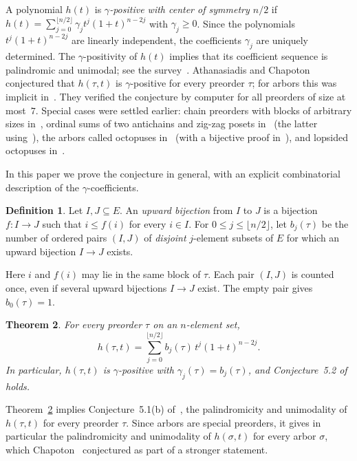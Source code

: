 \documentclass[11pt]{amsart}
\newtheorem{theorem}{Theorem}[section]
\theoremstyle{definition}
\newtheorem{definition}[theorem]{Definition}
\theoremstyle{remark}
\numberwithin{equation}{section}
\begin{document}
A polynomial $h(t)$ is \emph{$\gamma$-positive with center of symmetry $n/2$} if $h(t)=\sum_{j=0}^{\lfloor n/2\rfloor}\gamma_j t^j(1+t)^{n-2j}$ with $\gamma_j\ge 0$. Since the polynomials $t^j(1+t)^{n-2j}$ are linearly independent, the coefficients $\gamma_j$ are uniquely determined. The $\gamma$-positivity of $h(t)$ implies that its coefficient sequence is palindromic and unimodal; see the survey~\cite{Ath18}. Athanasiadis and Chapoton~\cite[Conjecture~5.2]{AC} conjectured that $h(\tau,t)$ is $\gamma$-positive for every preorder $\tau$; for arbors this was implicit in~\cite{Cha}. They verified the conjecture by computer for all preorders of size at most~$7$. Special cases were settled earlier: chain preorders with blocks of arbitrary sizes in~\cite{Ath25}, ordinal sums of two antichains and zig-zag posets in~\cite[Section~9]{AC} (the latter using~\cite{WZC}), the arbors called octopuses in~\cite{AXY} (with a bijective proof in~\cite{Men}), and lopsided octopuses in~\cite{Men}.

In this paper we prove the conjecture in general, with an explicit combinatorial description of the $\gamma$-coefficients.

\begin{definition}\label{def:upward}
Let $I,J\subseteq E$. An \emph{upward bijection} from $I$ to $J$ is a bijection $f\colon I\to J$ such that $i\le f(i)$ for every $i\in I$. For $0\le j\le \lfloor n/2\rfloor$, let $b_j(\tau)$ be the number of ordered pairs $(I,J)$ of \emph{disjoint} $j$-element subsets of $E$ for which an upward bijection $I\to J$ exists.
\end{definition}

Here $i$ and $f(i)$ may lie in the same block of $\tau$. Each pair $(I,J)$ is counted once, even if several upward bijections $I\to J$ exist. The empty pair gives $b_0(\tau)=1$.

\begin{theorem}\label{thm:main}
For every preorder $\tau$ on an $n$-element set,
\begin{equation}\label{eq:main}
h(\tau,t)=\sum_{j=0}^{\lfloor n/2\rfloor} b_j(\tau)\, t^j(1+t)^{n-2j}.
\end{equation}
In particular, $h(\tau,t)$ is $\gamma$-positive with $\gamma_j(\tau)=b_j(\tau)$, and Conjecture~5.2 of~\cite{AC} holds.
\end{theorem}

Theorem~\ref{thm:main} implies Conjecture~5.1(b) of~\cite{AC}, the palindromicity and unimodality of $h(\tau,t)$ for every preorder $\tau$. Since arbors are special preorders, it gives in particular the palindromicity and unimodality of $h(\sigma,t)$ for every arbor $\sigma$, which Chapoton~\cite{Cha} conjectured as part of a stronger statement.
\end{document}
